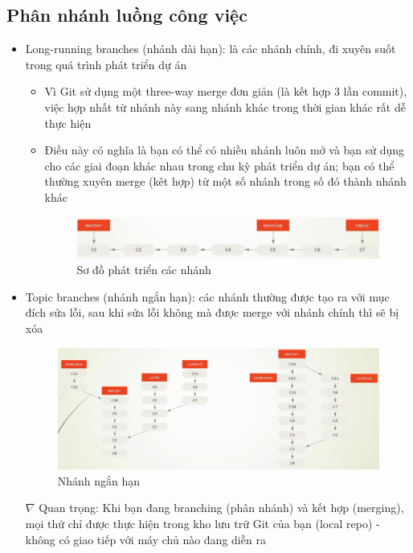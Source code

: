 \documentclass[12pt,a4paper]{report}
\begin{document}
\subsection{Phân nhánh luồng công việc} 
\begin{itemize}
\item Long-running branches (nhánh dài hạn): là các nhánh chính, đi xuyên suốt trong quá trình phát triển dự án
\begin{itemize}
\item Vì Git sử dụng một three-way merge đơn giản (là kết hợp 3 lần commit), việc hợp nhất từ nhánh này sang nhánh khác trong thời gian khác rất dễ thực hiện
\item Điều này có nghĩa là bạn có thể có nhiều nhánh luôn mở và bạn sử dụng cho các giai đoạn khác nhau trong chu kỳ phát triển dự án; bạn có thể thường xuyên merge (kêt hợp) từ một số nhánh trong số đó thành nhánh khác

\begin{figure}[!ht]
	\centering
	\includegraphics[width=0.8\linewidth]{screenshot058}
\caption{Sơ đồ phát triển các nhánh}
	\label{fig:screenshot058}
	\end{figure}
\end{itemize}
\item Topic branches (nhánh ngắn hạn): các nhánh thường được tạo ra với mục đích sửa lỗi, sau khi sửa lỗi không mà được merge với nhánh chính thì sẽ bị xóa

\begin{figure}[!ht]
	\centering
	\includegraphics[width=0.8\linewidth]{screenshot059}
				\caption{Nhánh ngắn hạn}	
						\label{fig:screenshot059}
\end{figure}

\item[$\nabla$]Quan trọng: Khi bạn đang branching (phân nhánh) và kết hợp (merging), mọi thứ chỉ được thực hiện trong kho lưu trữ Git của bạn (local repo) - không có giao tiếp với máy chủ nào đang diễn ra
\end{itemize}				
					
\end{document}
